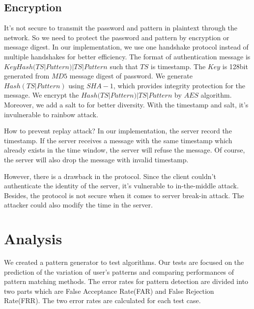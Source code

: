 \documentclass[twocolumn,showpacs,%
  nofootinbib,aps,%
  eqsecnum,prd,notitlepage,showkeys,10pt]{revtex4-1}
\begin{document}
\subsection{Encryption}
It's not secure to transmit the password and pattern in plaintext through the network. So we need to protect the password and pattern by encryption or message digest. In our implementation, we use one handshake protocol instead of multiple handshakes for better efficiency. The format of authentication message is $Key{Hash(TS|Pattern)|TS|Pattern}$ such that $TS$ is timestamp. The $Key$ is 128bit generated from $MD5$ message digest of password. We generate $Hash(TS|Pattern)$ using $SHA-1$, which provides integrity protection for the message. We encrypt the $Hash(TS|Pattern)|TS|Pattern$ by $AES$ algorithm. Moreover, we add a salt to for better diversity. With the timestamp and salt, it's invulnerable to rainbow attack.
\par
How to prevent replay attack? In our implementation, the server record the timestamp. If the server receives a message with the same timestamp which already exists in the time window, the server will refuse the message. Of course, the server will also drop the message with invalid timestamp.
\par
However, there is a drawback in the protocol. Since the client couldn't authenticate the identity of the server, it's vulnerable to in-the-middle attack. Besides, the protocol is not secure when it comes to server break-in attack. The attacker could also modify the time in the server.

\section{Analysis}
 We created a pattern generator to test algorithms. Our tests are focused on the prediction of the variation of user's patterns and comparing performances of pattern matching methods. The error rates for pattern detection are divided into two parts which are False Acceptance Rate(FAR) and False Rejection Rate(FRR)\cite{cho2000web}. The two error rates are calculated for each test case.
\end{document}

